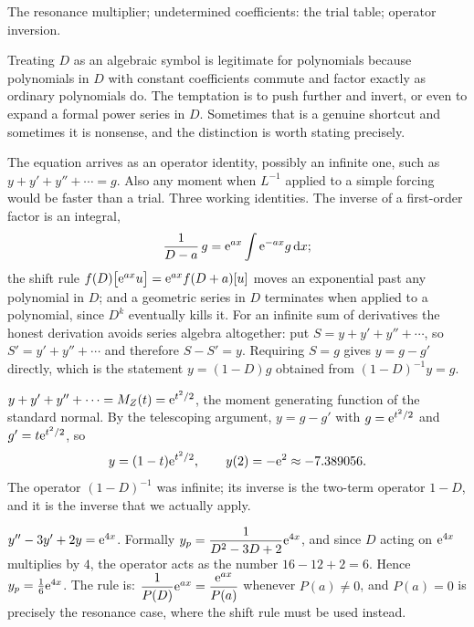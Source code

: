 \begin{seealsob}The resonance multiplier; undetermined coefficients: the trial table; operator inversion.\end{seealsob}

Treating $D$ as an algebraic symbol is legitimate for polynomials because polynomials in $D$ with constant coefficients commute and factor exactly as ordinary polynomials do. The temptation is to push further and invert, or even to expand a formal power series in $D$. Sometimes that is a genuine shortcut and sometimes it is nonsense, and the distinction is worth stating precisely.

\cue The equation arrives as an operator identity, possibly an infinite one, such as $y+y'+y''+\cdots=g$. Also any moment when $L^{-1}$ applied to a simple forcing would be faster than a trial.
\method Three working identities. The inverse of a first-order factor is an integral,
\[\frac{1}{D-a}\,g=\mathrm{e}^{ax}\int\mathrm{e}^{-ax}g\,\mathrm{d} x;\]
the shift rule $f(D)\bigl[\mathrm{e}^{ax}u\bigr]=\mathrm{e}^{ax}f(D+a)[u]$ moves an exponential past any polynomial in $D$; and a geometric series in $D$ terminates when applied to a polynomial, since $D^{k}$ eventually kills it. For an infinite sum of derivatives the honest derivation avoids series algebra altogether: put $S=y+y'+y''+\cdots$, so $S'=y'+y''+\cdots$ and therefore $S-S'=y$. Requiring $S=g$ gives $y=g-g'$ directly, which is the statement $y=(1-D)g$ obtained from $(1-D)^{-1}y=g$.

\begin{worked}
$y+y'+y''+\cdots=M_Z(t)=\mathrm{e}^{t^{2}/2}$, the moment generating function of the standard normal. By the telescoping argument, $y=g-g'$ with $g=\mathrm{e}^{t^{2}/2}$ and $g'=t\mathrm{e}^{t^{2}/2}$, so
\[y=(1-t)\mathrm{e}^{t^{2}/2},\qquad y(2)=-\mathrm{e}^{2}\approx-7.389056.\]
The operator $(1-D)^{-1}$ was infinite; its inverse is the two-term operator $1-D$, and it is the inverse that we actually apply.
\end{worked}

\begin{worked}
$y''-3y'+2y=\mathrm{e}^{4x}$. Formally $y_p=\dfrac{1}{D^{2}-3D+2}\mathrm{e}^{4x}$, and since $D$ acting on $\mathrm{e}^{4x}$ multiplies by $4$, the operator acts as the number $16-12+2=6$. Hence $y_p=\tfrac16\mathrm{e}^{4x}$. The rule is: $\dfrac{1}{P(D)}\mathrm{e}^{ax}=\dfrac{\mathrm{e}^{ax}}{P(a)}$ whenever $P(a)\ne0$, and $P(a)=0$ is precisely the resonance case, where the shift rule must be used instead.
\end{worked}

